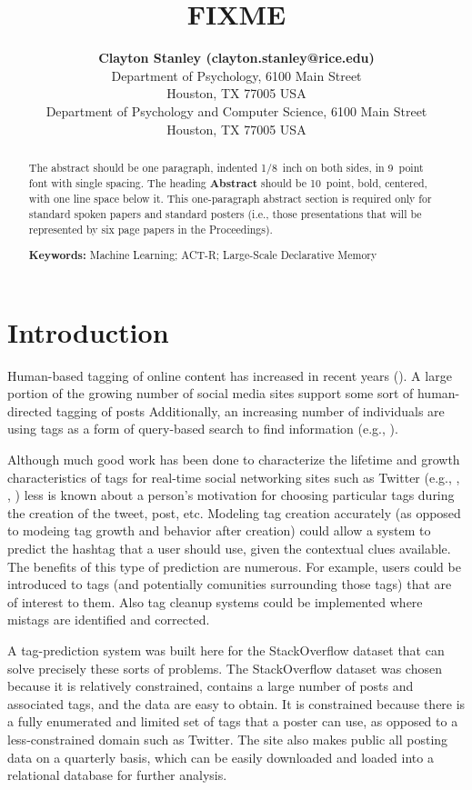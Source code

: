 \documentclass[10pt,letterpaper]{article}
\title{FIXME}
\author{{\large \bf Clayton Stanley (clayton.stanley@rice.edu)} \\
  Department of Psychology, 6100 Main Street \\
  Houston, TX 77005 USA 
  \AND {\large \bf Mike Byrne (byrne@rice.edu)} \\
  Department of Psychology and Computer Science, 6100 Main Street \\
  Houston, TX 77005 USA }
\begin{document}
\maketitle

\begin{abstract}
The abstract should be one paragraph, indented 1/8~inch on both sides,
in 9~point font with single spacing. The heading {\bf Abstract} should
be 10~point, bold, centered, with one line space below it. This
one-paragraph abstract section is required only for standard spoken
papers and standard posters (i.e., those presentations that will be
represented by six page papers in the Proceedings).

\textbf{Keywords:} 
Machine Learning; ACT-R; Large-Scale Declarative Memory
\end{abstract}

\section{Introduction}

Human-based tagging of online content has increased in recent years (\cite{Chang2010}).
A large portion of the growing number of social media sites support some sort of human-directed tagging of posts
Additionally, an increasing number of individuals are using tags as a form of query-based search to find information
(e.g., \cite{Diakopoulos2010}).

Although much good work has been done to characterize the lifetime and growth characteristics of tags for real-time social networking sites such as Twitter
(e.g., \cite{Bauer2012}, \cite{Tsur2012}, \cite{Chang2010})
less is known about a person's motivation for choosing particular tags during the creation of the tweet, post, etc.
Modeling tag creation accurately (as opposed to modeing tag growth and behavior after creation) could allow a system to predict the hashtag that a user should use, given the contextual clues available.
The benefits of this type of prediction are numerous.
For example, users could be introduced to tags (and potentially comunities surrounding those tags) that are of interest to them.
Also tag cleanup systems could be implemented where mistags are identified and corrected.

A tag-prediction system was built here for the StackOverflow dataset that can solve precisely these sorts of problems.
The StackOverflow dataset was chosen because it is relatively constrained, contains a large number of posts and associated tags, and the data are easy to obtain.
It is constrained because there is a fully enumerated and limited set of tags that a poster can use, as opposed to a less-constrained domain such as Twitter.
The site also makes public all posting data on a quarterly basis, which can be easily downloaded and loaded into a relational database for further analysis.
\end{document}
